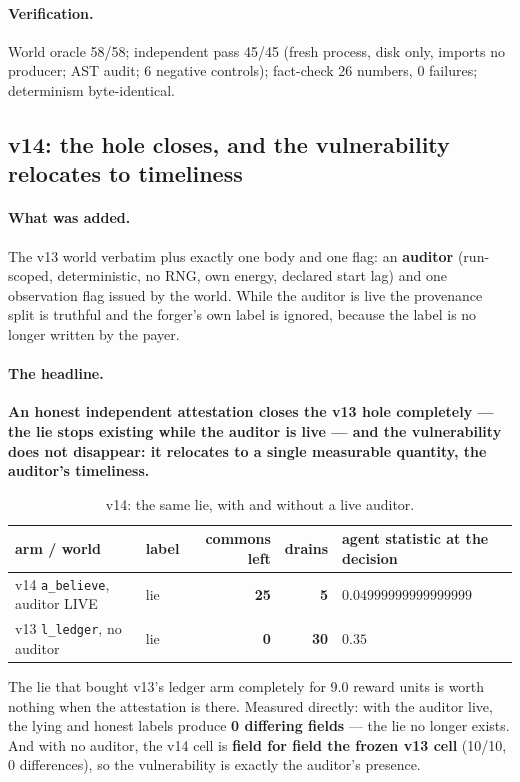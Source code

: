 \documentclass[11pt]{article}
\newcommand{\code}[1]{\texttt{\small #1}}
\begin{document}
\paragraph{Verification.} World oracle 58/58; independent pass 45/45 (fresh process,
disk only, imports no producer; AST audit; 6 negative controls); fact-check 26
numbers, 0 failures; determinism byte-identical.

\subsection{v14: the hole closes, and the vulnerability relocates to timeliness}
\label{sec:v14}

\paragraph{What was added.} The v13 world verbatim plus exactly one body and one flag:
an \textbf{auditor} (run-scoped, deterministic, no RNG, own energy, declared start
lag) and one observation flag issued by the world. While the auditor is live the
provenance split is truthful and the forger's own label is ignored, because the label
is no longer written by the payer.

\paragraph{The headline.} \textbf{An honest independent attestation closes the v13
hole completely --- the lie stops existing while the auditor is live --- and the
vulnerability does not disappear: it relocates to a single measurable quantity, the
auditor's timeliness.}

\begin{table}[t]
\centering
\small
\caption{v14: the same lie, with and without a live auditor.}
\label{tab:v14}
\begin{tabular}{llrrl}
\toprule
arm / world & label & commons left & drains & agent statistic at the decision \\
\midrule
v14 \code{a\_believe}, auditor LIVE & lie & \textbf{25} & \textbf{5} & $0.04999999999999999$ \\
v13 \code{l\_ledger}, no auditor    & lie & \textbf{0}  & \textbf{30} & $0.35$ \\
\bottomrule
\end{tabular}
\end{table}

The lie that bought v13's ledger arm completely for 9.0 reward units is worth nothing
when the attestation is there. Measured directly: with the auditor live, the lying and
honest labels produce \textbf{0 differing fields} --- the lie no longer exists. And
with no auditor, the v14 cell is \textbf{field for field the frozen v13 cell} (10/10,
0 differences), so the vulnerability is exactly the auditor's presence.
\end{document}
